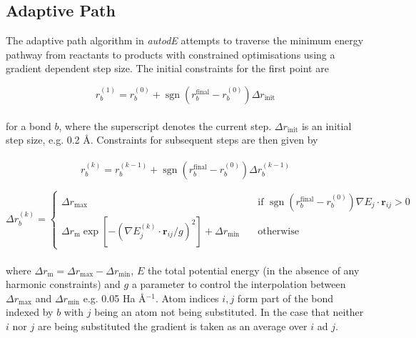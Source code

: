 \documentclass[10pt]{article}
\DeclareMathOperator{\sgn}{sgn}
\begin{document}
\subsection{Adaptive Path}

The adaptive path algorithm in \emph{autodE} attempts to traverse the minimum energy pathway from reactants to products with constrained optimisations using a gradient dependent step size. The initial constraints for the first point are

\begin{equation}
r_b^{(1)} = r_b^{(0)} + \sgn(r_b^\text{final} - r_b^{(0)})\Delta r_\text{init}
\end{equation}
\\
for a bond $b$, where the superscript denotes the current step. $\Delta r_\text{init}$ is an initial step size, e.g. 0.2 Å. Constraints for subsequent steps are then given by
\\\\
\begin{equation}
r_b^{(k)} = r_b^{(k-1)} + \sgn(r_b^\text{final} - r_b^{(0)})\Delta r_b^{(k-1)}
\end{equation}

\begin{equation}
\Delta r_b^{(k)} = 
\begin{cases}
\Delta r_\text{max} \quad &\text{if } \sgn(r_b^\text{final} - r_b^{(0)}) \nabla E_{j} \cdot \boldsymbol{r}_{ij} > 0 \\
\Delta r_\text{m}\exp\left[-\left({\nabla E_{j}^{(k)} \cdot \boldsymbol{r}_{ij}}/{g} \right)^2\right] + \Delta r_\text{min} \quad &\text{otherwise}
\end{cases}
\end{equation}
\\
where $\Delta r_\text{m} = \Delta r_\text{max} - \Delta r_\text{min}$, $E$ the total potential energy (in the absence of any harmonic constraints) and $g$ a parameter to control the interpolation between $\Delta r_\text{max}$ and $\Delta r_\text{min}$ e.g. 0.05 Ha Å$^{-1}$. Atom indices $i, j$ form part of the bond indexed by $b$ with $j$ being an atom not being substituted. In the case that neither $i$ nor $j$ are being substituted the gradient is taken as an average over $i$ ad $j$. 
\end{document}
